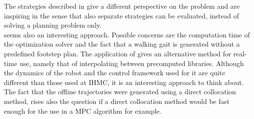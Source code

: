 The strategies described in \cite{gao2017increase} give a different perspective on the problem and are inspiring in the sense that also separate strategies can be evaluated, instead of solving a planning problem only. \\
\cite{liu2015trajectory} seems also an interesting approach. Possible concerns are the computation time of the optimization solver and the fact that a walking gait is generated without a predefined footstep plan.
The application of \cite{nguyen2017dynamic} gives an alternative method for real-time use, namely that of interpolating between precomputed libraries. Although the dynamics of the robot and the control framework used for it are quite different than those used at IHMC, it is an interesting approach to think about. The fact that the offline trajectories were generated using a direct collocation method, rises also the question if a direct collocation method would be fast enough for the use in a \ac{MPC} algorithm for example.\\